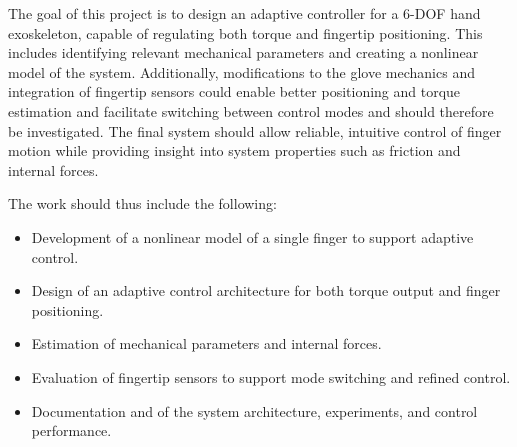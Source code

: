 The goal of this project is to design an adaptive controller for a \mbox{6-DOF} hand exoskeleton, capable of regulating both torque and fingertip positioning. This includes identifying relevant mechanical parameters and creating a nonlinear model of the system. Additionally, modifications to the glove mechanics and integration of fingertip sensors could enable better positioning and torque estimation and facilitate switching between control modes and should therefore be investigated. The final system should allow reliable, intuitive control of finger motion while providing insight into system properties such as friction and internal forces.

The work should thus include the following:
\begin{itemize}
	\item Development of a nonlinear model of a single finger to support adaptive control.
    \item Design of an adaptive control architecture for both torque output and finger positioning.
    \item Estimation of mechanical parameters and internal forces.
    \item Evaluation of fingertip sensors to support mode switching and refined control.
    \item Documentation and of the system architecture, experiments, and control performance.
\end{itemize}